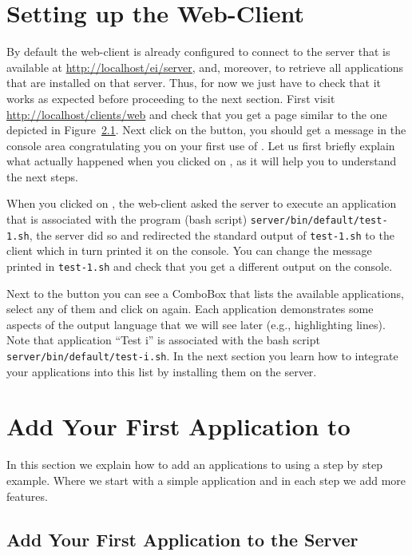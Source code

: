 \section{Setting up the \ei Web-Client}

By default the web-client is already configured to connect to the \ei
server that is available at \url{http://localhost/ei/server}, and,
moreover, to retrieve all applications that are installed on that
server. Thus, for now we just have to check that it works as expected
before proceeding to the next section.
%
First visit \url{http://localhost/clients/web} and check that you get
a page similar to the one depicted in Figure~\ref{}.  Next click on
the \applybutton button, you should get a message in the console area
congratulating you on your first use of \ei. Let us first briefly
explain what actually happened when you clicked on \applybutton, as it
will help you to understand the next steps.

When you clicked on \applybutton, the web-client asked the server to
execute an application that is associated with the program (bash
script) \texttt{server/bin/default/test-1.sh}, the server did so and
redirected the standard output of \texttt{test-1.sh} to the client
which in turn printed it on the console. You can change the message
printed in \texttt{test-1.sh} and check that you get a different
output on the console.

Next to the \applybutton button you can see a ComboBox that lists the
available applications, select any of them and click on \applybutton
again. Each application demonstrates some aspects of the output
language that we will see later (e.g., highlighting lines). Note that
application ``Test i'' is associated with the bash script
\texttt{server/bin/default/test-i.sh}. 
%
In the next section you learn how to integrate your applications into
this list by installing them on the \ei server.

\section{Add Your First Application to \ei}

In this section we explain how to add an applications to \ei using a
step by step example. Where we start with a simple application and in
each step we add more features.


\subsection{Add Your First Application to the \ei Server}

